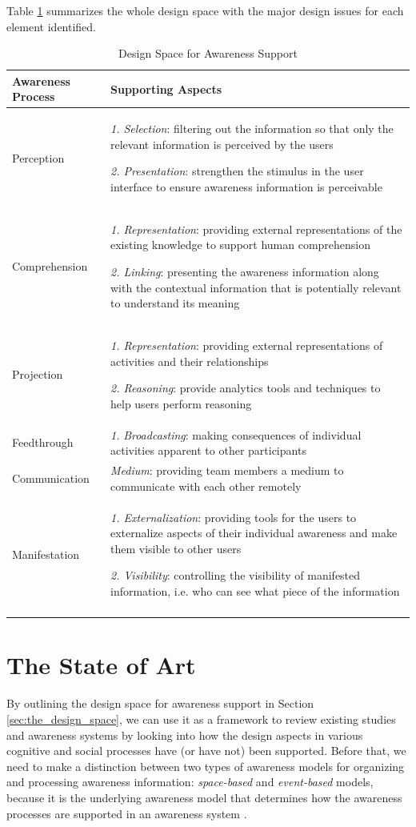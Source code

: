 Table \ref{tab:design_space} summarizes the whole design space with the major design issues for each element identified.

{\footnotesize
   \begin{longtable}{>{\raggedright}m{1.2in}>{\raggedright}p{4.3in}}
\toprule 
\textbf{Awareness Process} & \textbf{Supporting Aspects}\tabularnewline
\midrule 
Perception & \emph{1. Selection}: filtering out the information so that only the
relevant information is perceived by the users

\emph{2. Presentation}: strengthen the stimulus in the user interface
to ensure awareness information is perceivable\tabularnewline
\midrule 
Comprehension & \emph{1. Representation}: providing external representations of the
existing knowledge to support human comprehension

\emph{2. Linking}: presenting the awareness information
along with the contextual information that is potentially relevant
to understand its meaning\tabularnewline
\midrule 
Projection & \emph{1. Representation}: providing external representations of activities
and their relationships 

\emph{2. Reasoning}: provide analytics tools and techniques to help
users perform reasoning\tabularnewline
\midrule 
Feedthrough & \emph{1. }\textit{Broadcasting}: making consequences of individual
activities apparent to other participants\tabularnewline
\midrule 
Communication & \textit{Medium}: providing team members a medium to communicate
with each other remotely\tabularnewline
\midrule 
Manifestation & \textit{1. Externalization}: providing tools for the users to externalize aspects of their individual awareness and make them visible to other users

\textit{2. Visibility}: controlling the visibility of manifested information,
i.e. who can see what piece of the information\tabularnewline
\bottomrule

\caption{Design Space for Awareness Support}
\label{tab:design_space}

\end{longtable}   
}


\section{The State of Art} %
\label{sec:the_state_of_art}
By outlining the design space for awareness support in Section \ref{sec:the_design_space}, we can use it as a framework to review existing studies and awareness systems by looking into how the design aspects in various cognitive and social processes have (or have not) been supported. Before that, we need to make a distinction between two types of awareness models for organizing and processing awareness information: \emph{space-based} and \emph{event-based} models, because it is the underlying awareness model that determines how the awareness processes are supported in an awareness system \cite{Gross2004}.

